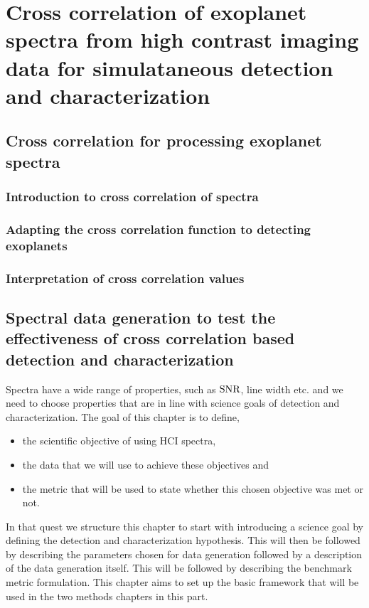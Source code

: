 \part{Cross correlation of exoplanet spectra from high contrast imaging data for simulataneous detection and characterization}
\startcontents[chapters]
\printmyminitoc{}
\chapter{Cross correlation for processing exoplanet spectra}
\label{chap:II.1}
\section{Introduction to cross correlation of spectra}
\section{Adapting the cross correlation function to detecting exoplanets}
\section{Interpretation of cross correlation values}

\chapter{Spectral data generation to test the effectiveness of cross correlation based detection and characterization}
\label{chap:II.2}
Spectra have a wide range of properties, such as $\rm{SNR}$, line width etc. and we need to choose properties that are in line with science goals of detection and characterization.
The goal of this chapter is to define,
\begin{itemize}
    \item the scientific objective of using HCI spectra,
    \item the data that we will use to achieve these objectives and
    \item the metric that will be used to state whether this chosen objective was met or not.
\end{itemize}
In that quest we structure this chapter to start with introducing a science goal by defining the detection and characterization hypothesis.
This will then be followed by describing the parameters chosen for data generation followed by a description of the data generation itself.
This will be followed by describing the benchmark metric formulation.
This chapter aims to set up the basic framework that will be used in the two methods chapters in this part.

